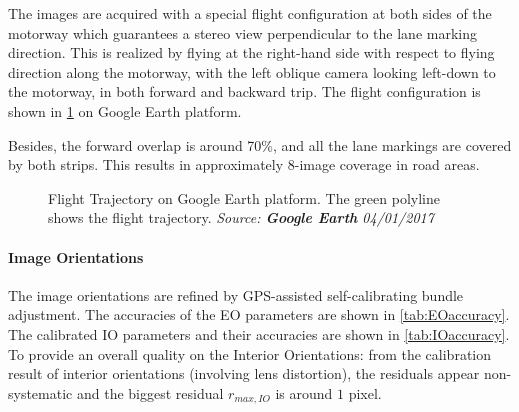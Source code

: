 \clearpage

The images are acquired with a special flight configuration at both sides of the motorway which guarantees a stereo view perpendicular to the lane marking direction. This is realized by flying at the right-hand side with respect to flying direction along the motorway, with the left oblique camera looking left-down to the motorway, in both forward and backward trip. The flight configuration is shown in \cref{fig:FlightTrajectory} on Google Earth platform.

Besides, the forward overlap is around 70\%, and all the lane markings are covered by both strips. This results in approximately 8-image coverage in road areas.

\begin{figure}%
  \centering
  \caption{Flight Trajectory on Google Earth platform. The green polyline shows the flight trajectory. \textit{Source: \textbf{Google Earth} 04/01/2017}}
  \label{fig:FlightTrajectory}
\end{figure}


\paragraph{Image Orientations}
The image orientations are refined by GPS-assisted self-calibrating bundle adjustment. The accuracies of the EO parameters are shown in \cref{tab:EOaccuracy}. The calibrated IO parameters and their accuracies are shown in \cref{tab:IOaccuracy}. To provide an overall quality on the Interior Orientations: from the calibration result of interior orientations (involving lens distortion), the residuals appear non-systematic and the biggest residual $r_{max, IO}$ is around $1$ pixel.
\clearpage %

